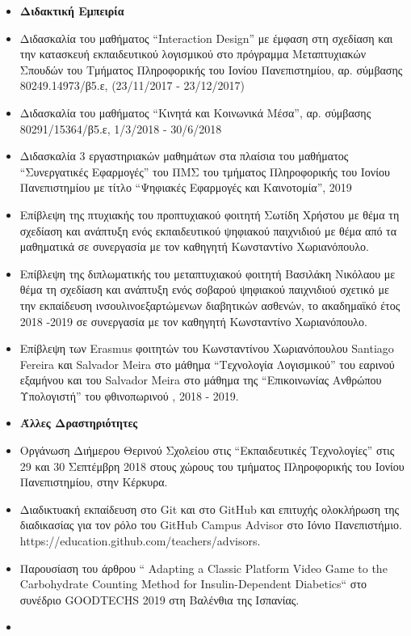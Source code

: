 \documentclass[%
    11pt,
  oneside
  ]{memoir}
\begin{document}
\begin{itemize}
\item
  \textbf{Διδακτική Εμπειρία}
\item
  Διδασκαλία του μαθήματος ``Interaction Design'' με έμφαση στη σχεδίαση
  και την κατασκευή εκπαιδευτικού λογισμικού στο πρόγραμμα Μεταπτυχιακών
  Σπουδών του Τμήματος Πληροφορικής του Ιονίου Πανεπιστημίου, αρ.
  σύμβασης 80249.14973/β5.ε, (23/11/2017 - 23/12/2017)
\item
  Διδασκαλία του μαθήματος ``Κινητά και Κοινωνικά Μέσα'', αρ. σύμβασης
  80291/15364/β5.ε, 1/3/2018 - 30/6/2018
\item
  Διδασκαλία 3 εργαστηριακών μαθημάτων στα πλαίσια του μαθήματος
  ``Συνεργατικές Εφαρμογές'' του ΠΜΣ του τμήματος Πληροφορικής του
  Ιονίου Πανεπιστημίου με τίτλο ``Ψηφιακές Εφαρμογές και Καινοτομία'',
  2019
\item
  Επίβλεψη της πτυχιακής του προπτυχιακού φοιτητή Σωτίδη Χρήστου με θέμα
  τη σχεδίαση και ανάπτυξη ενός εκπαιδευτικού ψηφιακού παιχνιδιού με
  θέμα από τα μαθηματικά σε συνεργασία με τον καθηγητή Κωνσταντίνο
  Χωριανόπουλο.
\item
  Επίβλεψη της διπλωματικής του μεταπτυχιακού φοιτητή Βασιλάκη Νικόλαου
  με θέμα τη σχεδίαση και ανάπτυξη ενός σοβαρού ψηφιακού παιχνιδιού
  σχετικό με την εκπαίδευση ινσουλινοεξαρτώμενων διαβητικών ασθενών, το
  ακαδημαϊκό έτος 2018 -2019 σε συνεργασία με τον καθηγητή Κωνσταντίνο
  Χωριανόπουλο.
\item
  Επίβλεψη των Erasmus φοιτητών του Κωνσταντίνου Χωριανόπουλου Santiago
  Fereira και Salvador Meira στο μάθημα ``Τεχνολογία Λογισμικού'' του
  εαρινού εξαμήνου και του Salvador Meira στο μάθημα της ``Επικοινωνίας
  Ανθρώπου Υπολογιστή'' του φθινοπωρινού , 2018 - 2019.
\item
  \textbf{Άλλες Δραστηριότητες}
\item
  Οργάνωση Διήμερου Θερινού Σχολείου στις ``Εκπαιδευτικές Τεχνολογίες''
  στις 29 και 30 Σεπτέμβρη 2018 στους χώρους του τμήματος Πληροφορικής
  του Ιονίου Πανεπιστημίου, στην Κέρκυρα.
\item
  Διαδικτυακή εκπαίδευση στο Git και στο GitHub και επιτυχής ολοκλήρωση
  της διαδικασίας για τον ρόλο του GitHub Campus Advisor στο Ιόνιο
  Πανεπιστήμιο. https://education.github.com/teachers/advisors.
\item
  Παρουσίαση του άρθρου `` Adapting a Classic Platform Video Game to the
  Carbohydrate Counting Method for Insulin-Dependent Diabetics`` στο
  συνέδριο GOODTECHS 2019 στη Βαλένθια της Ισπανίας.
\item

\end{itemize}
\end{document}
